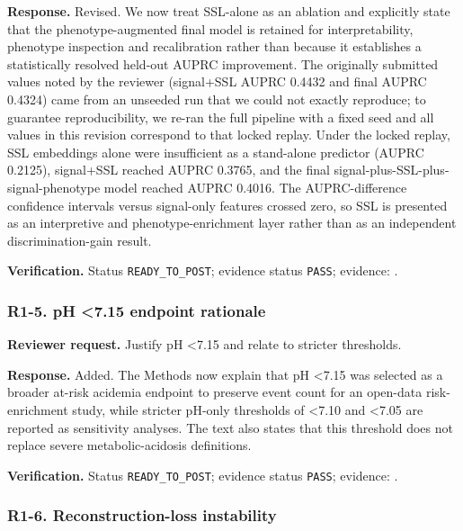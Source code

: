 \documentclass[11pt]{article}
\begin{document}
\textbf{Response.} Revised. We now treat SSL-alone as an ablation and explicitly state that the phenotype-augmented final model is retained for interpretability, phenotype inspection and recalibration rather than because it establishes a statistically resolved held-out AUPRC improvement. The originally submitted values noted by the reviewer (signal+SSL AUPRC 0.4432 and final AUPRC 0.4324) came from an unseeded run that we could not exactly reproduce; to guarantee reproducibility, we re-ran the full pipeline with a fixed seed and all values in this revision correspond to that locked replay. Under the locked replay, SSL embeddings alone were insufficient as a stand-alone predictor (AUPRC 0.2125), signal+SSL reached AUPRC 0.3765, and the final signal-plus-SSL-plus-signal-phenotype model reached AUPRC 0.4016. The AUPRC-difference confidence intervals versus signal-only features crossed zero, so SSL is presented as an interpretive and phenotype-enrichment layer rather than as an independent discrimination-gain result.


\textbf{Verification.} Status \texttt{READY\_TO\_POST}; evidence status \texttt{PASS}; evidence: .


\subsubsection*{R1-5. pH <7.15 endpoint rationale}

\textbf{Reviewer request.} Justify pH <7.15 and relate to stricter thresholds.


\textbf{Response.} Added. The Methods now explain that pH <7.15 was selected as a broader at-risk acidemia endpoint to preserve event count for an open-data risk-enrichment study, while stricter pH-only thresholds of <7.10 and <7.05 are reported as sensitivity analyses. The text also states that this threshold does not replace severe metabolic-acidosis definitions.


\textbf{Verification.} Status \texttt{READY\_TO\_POST}; evidence status \texttt{PASS}; evidence: .


\subsubsection*{R1-6. Reconstruction-loss instability}
\end{document}
